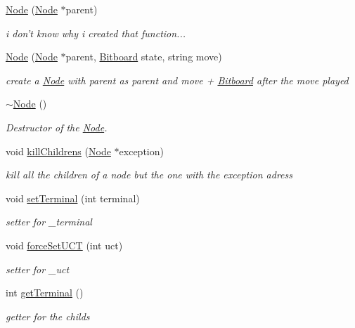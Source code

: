 \begin{DoxyCompactItemize}
\item 
\hyperlink{classmcts_1_1_node_ac5c6318435fbc51f472c9edf2866dd11}{Node} (\hyperlink{classmcts_1_1_node}{Node} $\ast$parent)
\begin{DoxyCompactList}\small\item\em i don't know why i created that function... \end{DoxyCompactList}\item 
\hyperlink{classmcts_1_1_node_adcd289dc09d8e1db572143abf7ee0d5a}{Node} (\hyperlink{classmcts_1_1_node}{Node} $\ast$parent, \hyperlink{class_bitboard}{Bitboard} state, string move)
\begin{DoxyCompactList}\small\item\em create a \hyperlink{classmcts_1_1_node}{Node} with parent as parent and move + \hyperlink{class_bitboard}{Bitboard} after the move played \end{DoxyCompactList}\item 
\hyperlink{classmcts_1_1_node_acc91ea418dba8fa979b276e7d0a3af58}{$\sim$\+Node} ()
\begin{DoxyCompactList}\small\item\em Destructor of the \hyperlink{classmcts_1_1_node}{Node}. \end{DoxyCompactList}\item 
void \hyperlink{classmcts_1_1_node_ac01b59cb23a9cbbf0ccd710f42ac5c71}{kill\+Childrens} (\hyperlink{classmcts_1_1_node}{Node} $\ast$exception)
\begin{DoxyCompactList}\small\item\em kill all the children of a node but the one with the exception adress \end{DoxyCompactList}\item 
void \hyperlink{classmcts_1_1_node_acaeef5a74238b304834bacdba95ce46f}{set\+Terminal} (int terminal)
\begin{DoxyCompactList}\small\item\em setter for \+\_\+terminal \end{DoxyCompactList}\item 
void \hyperlink{classmcts_1_1_node_aa4e75d679f31d3f687342429892ab8ab}{force\+Set\+U\+C\+T} (int uct)
\begin{DoxyCompactList}\small\item\em setter for \+\_\+uct \end{DoxyCompactList}\item 
int \hyperlink{classmcts_1_1_node_abdae55b6017c6f223b63d2fa193c4420}{get\+Terminal} ()
\begin{DoxyCompactList}\small\item\em getter for the childs \end{DoxyCompactList}\item 

\end{DoxyCompactItemize}
